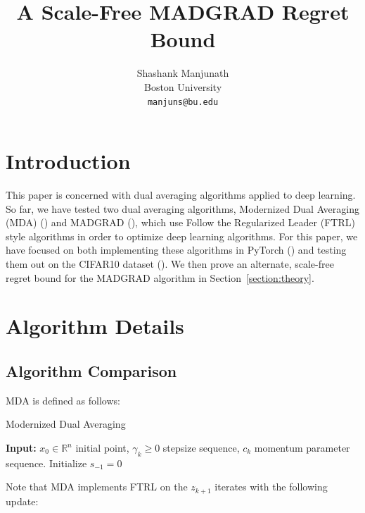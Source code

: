 \documentclass{article}
\title{A Scale-Free MADGRAD Regret Bound}
\author{
  Shashank Manjunath \\
  Boston University \\
  \texttt{manjuns@bu.edu} \\
}
\newcommand{\R}{\mathbb{R}}
\begin{document}
\maketitle

\section{Introduction}

This paper is concerned with dual averaging algorithms applied to deep learning. So far, we have tested two dual
averaging algorithms, Modernized Dual Averaging (MDA) (\cite{jelassi_dual_2020}) and MADGRAD
(\cite{defazio_adaptivity_nodate}), which use Follow the Regularized Leader (FTRL) style algorithms in order to optimize
deep learning algorithms. For this paper, we have focused on both implementing these algorithms in PyTorch
(\cite{paszke_pytorch_2019}) and testing them out on the CIFAR10 dataset (\cite{krizhevsky_learning_nodate}). We then
prove an alternate, scale-free regret bound for the MADGRAD algorithm in Section~\ref{section:theory}.

\section{Algorithm Details}

\subsection{Algorithm Comparison}
MDA is defined as follows:

\begin{algorithm}
  \caption{Modernized Dual Averaging}\label{algo:mda}
  \textbf{Input:} $x_0 \in \R^n$ initial point, $\gamma_k \geq 0$ stepsize sequence, $c_k$ momentum parameter
  sequence. Initialize $s_{-1} = 0$ \\
\end{algorithm}

Note that MDA implements FTRL on the $z_{k+1}$ iterates with the following update:
\end{document}

